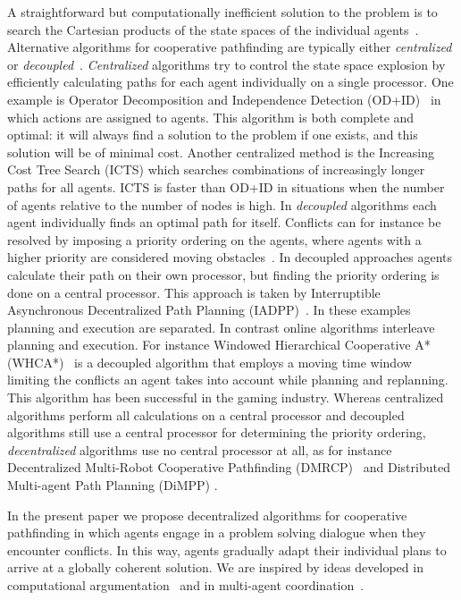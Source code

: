 A straightforward but computationally inefficient solution to the problem is to 
search the Cartesian products of the state spaces of the individual 
agents~\nocite{hopcroft1984}. Alternative algorithms for cooperative 
pathfinding 
are typically either \emph{centralized} or \emph{decoupled}~\cite{latombe1991}.
\emph{Centralized} algorithms try to control the state space explosion by 
efficiently calculating paths for each agent individually on a single 
processor. One example is Operator Decomposition and Independence Detection 
(OD+ID)~\cite{standley2010,standley2011} in which actions are assigned to agents. 
This algorithm is both complete and 
optimal: it will always find a solution to the problem if one exists, and this 
solution will be of minimal cost.
Another centralized method is the Increasing Cost Tree 
Search (ICTS) \cite{sharon2013} which searches combinations of increasingly 
longer paths for all agents. ICTS is faster than OD+ID in situations when the 
number of agents relative to the number of nodes is high.
In \emph{decoupled} algorithms each agent individually finds an optimal path 
for itself. Conflicts can for instance be resolved by imposing a priority 
ordering on the agents, where agents with a higher priority are considered 
moving obstacles~\cite{bennewitz2002}.
In decoupled approaches agents calculate their path on their own processor, but finding the priority ordering is done on a central 
processor. This 
approach is taken by Interruptible Asynchronous Decentralized Path Planning 
(IADPP)~\cite{cap2012}.
In these examples planning and execution are separated. In contrast online algorithms 
interleave planning and execution. For instance Windowed Hierarchical Cooperative A* 
(WHCA*)~\cite{silver2005} is a decoupled algorithm that employs a moving time window limiting the 
conflicts an agent takes into account while planning and replanning. This 
algorithm has been successful in the gaming industry.
Whereas centralized algorithms perform all calculations on a central processor and decoupled algorithms still use a central processor for determining the priority ordering, \emph{decentralized} algorithms use no central processor at all, as for instance Decentralized 
Multi-Robot Cooperative Pathfinding (DMRCP)~\cite{wei2016} and Distributed 
Multi-agent Path Planning (DiMPP) \cite{chouhan2017}.

In the present paper we propose decentralized algorithms for cooperative 
pathfinding in which agents engage in a problem solving dialogue when they 
encounter conflicts. In this way, agents gradually adapt their individual 
plans to arrive at a globally coherent solution. We are inspired by ideas 
developed in 
computational argumentation~\cite{rahwanSimari2009} and in multi-agent 
coordination~\cite[pp.~202--204]{wooldridge2009}.

